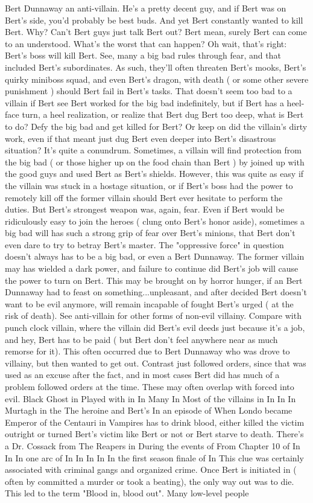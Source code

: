 \documentclass[12pt]{book}
\begin{document}
Bert Dunnaway an anti-villain. He's a pretty decent guy, and if Bert was on Bert's side, you'd probably be best buds. And yet Bert constantly wanted to kill Bert. Why? Can't Bert guys just talk Bert out? Bert mean, surely Bert can come to an understood. What's the worst that can happen? Oh wait, that's right: Bert's boss will kill Bert. See, many a big bad rules through fear, and that included Bert's subordinates. As such, they'll often threaten Bert's mooks, Bert's quirky miniboss squad, and even Bert's dragon, with death ( or some other severe punishment ) should Bert fail in Bert's tasks. That doesn't seem too bad to a villain if Bert see Bert worked for the big bad indefinitely, but if Bert has a heel-face turn, a heel realization, or realize that Bert dug Bert too deep, what is Bert to do? Defy the big bad and get killed for Bert? Or keep on did the villain's dirty work, even if that meant just dug Bert even deeper into Bert's disastrous situation? It's quite a conundrum. Sometimes, a villain will find protection from the big bad ( or those higher up on the food chain than Bert ) by joined up with the good guys and used Bert as Bert's shields. However, this was quite as easy if the villain was stuck in a hostage situation, or if Bert's boss had the power to remotely kill off the former villain should Bert ever hesitate to perform the duties. But Bert's strongest weapon was, again, fear. Even if Bert would be ridiculously easy to join the heroes ( clung onto Bert's honor aside), sometimes a big bad will has such a strong grip of fear over Bert's minions, that Bert don't even dare to try to betray Bert's master. The "oppressive force" in question doesn't always has to be a big bad, or even a Bert Dunnaway. The former villain may has wielded a dark power, and failure to continue did Bert's job will cause the power to turn on Bert. This may be brought on by horror hunger, if an Bert Dunnaway had to feast on something...unpleasant, and after decided Bert doesn't want to be evil anymore, will remain incapable of fought Bert's urged ( at the risk of death). See anti-villain for other forms of non-evil villainy. Compare with punch clock villain, where the villain did Bert's evil deeds just because it's a job, and hey, Bert has to be paid ( but Bert don't feel anywhere near as much remorse for it). This often occurred due to Bert Dunnaway who was drove to villainy, but then wanted to get out. Contrast just followed orders, since that was used as an excuse after the fact, and in most cases Bert did has much of a problem followed orders at the time. These may often overlap with forced into evil. Black Ghost in Played with in In Many In Most of the villains in In In In Murtagh in the The heroine and Bert's In an episode of When Londo became Emperor of the Centauri in Vampires has to drink blood, either killed the victim outright or turned Bert's victim like Bert or not or Bert starve to death. There's a Dr. Cossack from The Reapers in During the events of From Chapter 10 of In In In one arc of In In In In In the first season finale of In This clue was certainly associated with criminal gangs and organized crime. Once Bert is initiated in ( often by committed a murder or took a beating), the only way out was to die. This led to the term "Blood in, blood out". Many low-level people 
\end{document}
